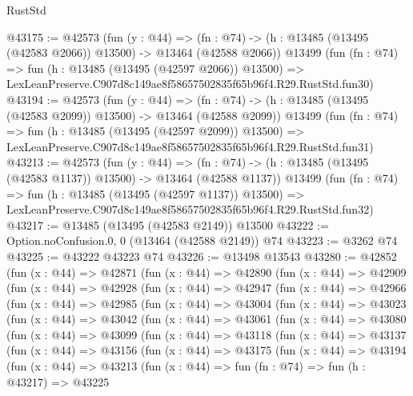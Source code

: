 \begin{lexlean}{RustStd}
\begin{coremodule}
@43175 := @42573
    (fun (y : @44) =>
    (fn : @74) -> (h : @13485 (@13495 (@42583 @2066)) @13500) -> @13464 (@42588 @2066))
    @13499
    (fun (fn : @74) =>
    fun (h : @13485 (@13495 (@42597 @2066)) @13500) =>
    LexLeanPreserve.C907d8c149ae8f58657502835f65b96f4.R29.RustStd.fun30)
@43194 := @42573
    (fun (y : @44) =>
    (fn : @74) -> (h : @13485 (@13495 (@42583 @2099)) @13500) -> @13464 (@42588 @2099))
    @13499
    (fun (fn : @74) =>
    fun (h : @13485 (@13495 (@42597 @2099)) @13500) =>
    LexLeanPreserve.C907d8c149ae8f58657502835f65b96f4.R29.RustStd.fun31)
@43213 := @42573
    (fun (y : @44) =>
    (fn : @74) -> (h : @13485 (@13495 (@42583 @1137)) @13500) -> @13464 (@42588 @1137))
    @13499
    (fun (fn : @74) =>
    fun (h : @13485 (@13495 (@42597 @1137)) @13500) =>
    LexLeanPreserve.C907d8c149ae8f58657502835f65b96f4.R29.RustStd.fun32)
@43217 := @13485 (@13495 (@42583 @2149)) @13500
@43222 := Option.noConfusion.{0, 0} (@13464 (@42588 @2149)) @74
@43223 := @3262 @74
@43225 := @43222 @43223 @74
@43226 := @13498 @13543
@43280 := @42852
    (fun (x : @44) =>
    @42871
      (fun (x : @44) =>
      @42890
        (fun (x : @44) =>
        @42909
          (fun (x : @44) =>
          @42928
            (fun (x : @44) =>
            @42947
              (fun (x : @44) =>
              @42966
                (fun (x : @44) =>
                @42985
                  (fun (x : @44) =>
                  @43004
                    (fun (x : @44) =>
                    @43023
                      (fun (x : @44) =>
                      @43042
                        (fun (x : @44) =>
                        @43061
                          (fun (x : @44) =>
                          @43080
                            (fun (x : @44) =>
                            @43099
                              (fun (x : @44) =>
                              @43118
                                (fun (x : @44) =>
                                @43137
                                  (fun (x : @44) =>
                                  @43156
                                    (fun (x : @44) =>
                                    @43175
                                      (fun (x : @44) =>
                                      @43194
                                        (fun (x : @44) =>
                                        @43213
                                          (fun (x : @44) =>
                                          fun (fn : @74) =>
                                          fun (h : @43217) =>
                                          @43225

\end{coremodule}
\end{lexlean}
